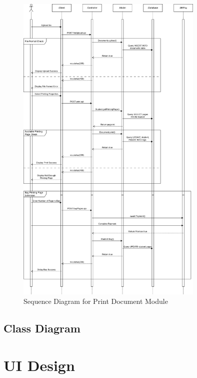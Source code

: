 \begin{figure}[htbp]
    \centering
    \includegraphics[width=0.8\textwidth]{Images/Diagrams/Print_sequence.png}
    \caption{Sequence Diagram for Print Document Module}
\end{figure}

\newpage
\subsection{Class Diagram}



\newpage
\section{UI Design}

